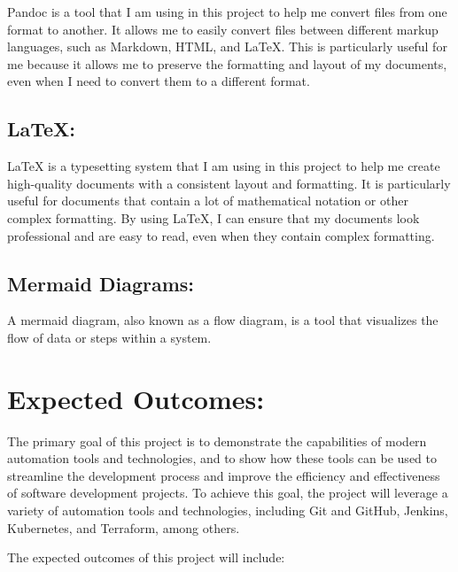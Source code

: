 \documentclass[
  10pt,
  paper=a4,
  ,captions=tableheading
]{scrartcl}
\begin{document}
Pandoc is a tool that I am using in this project to help me convert
files from one format to another. It allows me to easily convert files
between different markup languages, such as Markdown, HTML, and LaTeX.
This is particularly useful for me because it allows me to preserve the
formatting and layout of my documents, even when I need to convert them
to a different format.

\hypertarget{latex}{%
\subsection{LaTeX:}\label{latex}}

LaTeX is a typesetting system that I am using in this project to help me
create high-quality documents with a consistent layout and formatting.
It is particularly useful for documents that contain a lot of
mathematical notation or other complex formatting. By using LaTeX, I can
ensure that my documents look professional and are easy to read, even
when they contain complex formatting.

\hypertarget{mermaid-diagrams}{%
\subsection{Mermaid Diagrams:}\label{mermaid-diagrams}}

A mermaid diagram, also known as a flow diagram, is a tool that
visualizes the flow of data or steps within a system.

\hypertarget{expected-outcomes}{%
\section{Expected Outcomes:}\label{expected-outcomes}}

The primary goal of this project is to demonstrate the capabilities of
modern automation tools and technologies, and to show how these tools
can be used to streamline the development process and improve the
efficiency and effectiveness of software development projects. To
achieve this goal, the project will leverage a variety of automation
tools and technologies, including Git and GitHub, Jenkins, Kubernetes,
and Terraform, among others.

The expected outcomes of this project will include:
\end{document}
